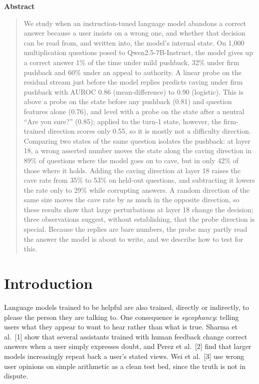 \documentclass[12pt]{report}
\theoremstyle{definition}
\begin{document}
\vspace{0.3cm}
\begin{center}{\small \bfseries Abstract}\end{center}
\begin{quote}
We study when an instruction-tuned language model abandons a correct answer because a user insists on a wrong one, and whether that decision can be read from, and written into, the model's internal state. On 1,000 multiplication questions posed to Qwen2.5-7B-Instruct, the model gives up a correct answer 1\% of the time under mild pushback, 32\% under firm pushback and 60\% under an appeal to authority. A linear probe on the residual stream just before the model replies predicts caving under firm pushback with AUROC 0.86 (mean-difference) to 0.90 (logistic). This is above a probe on the state before any pushback (0.81) and question features alone (0.76), and level with a probe on the state after a neutral ``Are you sure?'' (0.85); applied to the turn-1 state, however, the firm-trained direction scores only 0.55, so it is mostly not a difficulty direction. Comparing two states of the same question isolates the pushback: at layer 18, a wrong asserted number moves the state along the caving direction in 89\% of questions where the model goes on to cave, but in only 42\% of those where it holds. Adding the caving direction at layer 18 raises the cave rate from 35\% to 53\% on held-out questions, and subtracting it lowers the rate only to 29\% while corrupting answers. A random direction of the same size moves the cave rate by as much in the opposite direction, so these results show that large perturbations at layer 18 change the decision; three observations suggest, without establishing, that the probe direction is special. Because the replies are bare numbers, the probe may partly read the answer the model is about to write, and we describe how to test for this.
\end{quote}

\section*{Introduction}

Language models trained to be helpful are also trained, directly or indirectly, to please the person they are talking to. One consequence is \emph{sycophancy}: telling users what they appear to want to hear rather than what is true. Sharma et al.\ [1] show that several assistants trained with human feedback change correct answers when a user simply expresses doubt, and Perez et al.\ [2] find that larger models increasingly repeat back a user's stated views. Wei et al.\ [3] use wrong user opinions on simple arithmetic as a clean test bed, since the truth is not in dispute.
\end{document}
